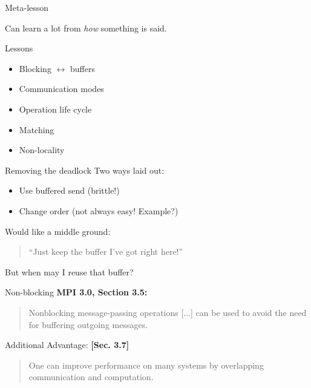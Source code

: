 \documentclass[english,compress]{beamer}
\begin{document}
\begin{frame}{Meta-lesson}
  \begin{center}
    \Large
    Can learn a lot from \emph{how} something is said.
  \end{center}
\end{frame}
\begin{frame}{Lessons}
  \begin{itemize}
    \item Blocking $\leftrightarrow$ buffers
    \item Communication modes
    \item Operation life cycle
    \item Matching
    \item Non-locality
  \end{itemize}
\end{frame}
\begin{frame}{Removing the deadlock}
  Two ways laid out:
  \pause
  \begin{itemize}
    \item Use buffered send (brittle!)
    \item Change order (not always easy! Example?)
  \end{itemize}
  \pause
  Would like a middle ground: 
  \begin{quote}
  ``Just keep the buffer I've got right here!''
  \end{quote}
  But when may I reuse that buffer?
\end{frame}
\begin{frame}{Non-blocking}
  \pause
  \bigskip
  \textbf{MPI 3.0, Section 3.5:}
  \begin{quote}
    \upshape
    Nonblocking message-passing operations [...] can be used to avoid
    the need for buffering outgoing messages.
  \end{quote}
  Additional Advantage: \textbf{[Sec. 3.7]}
  \begin{quote}
    \upshape
    One can improve performance on many systems by overlapping
    communication and computation.
  \end{quote}
\end{frame}
\questionframe{}
\imagecreditslide
\end{document}
